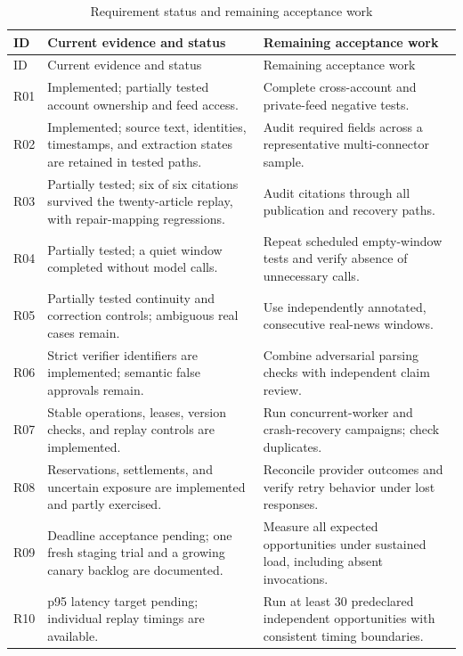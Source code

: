 \begingroup
\small
\renewcommand{\arraystretch}{1.05}
\begin{longtable}{L{0.9cm}L{6cm}L{\dimexpr\linewidth-6.9cm-6\tabcolsep\relax}}
\caption{Requirement status and remaining acceptance work}\label{tab:traceability}\\
\toprule ID & Current evidence and status & Remaining acceptance work \\ \midrule
\endfirsthead
\toprule ID & Current evidence and status & Remaining acceptance work \\ \midrule
\endhead
\bottomrule
\endfoot
R01 & Implemented; partially tested account ownership and feed access.
& Complete cross-account and private-feed negative tests. \\
R02 & Implemented; source text, identities, timestamps, and extraction states are retained in tested paths.
& Audit required fields across a representative multi-connector sample. \\
R03 & Partially tested; six of six citations survived the twenty-article replay, with repair-mapping regressions.
& Audit citations through all publication and recovery paths. \\
R04 & Partially tested; a quiet window completed without model calls.
& Repeat scheduled empty-window tests and verify absence of unnecessary calls. \\
R05 & Partially tested continuity and correction controls; ambiguous real cases remain.
& Use independently annotated, consecutive real-news windows. \\
R06 & Strict verifier identifiers are implemented; semantic false approvals remain.
& Combine adversarial parsing checks with independent claim review. \\
R07 & Stable operations, leases, version checks, and replay controls are implemented.
& Run concurrent-worker and crash-recovery campaigns; check duplicates. \\
R08 & Reservations, settlements, and uncertain exposure are implemented and partly exercised.
& Reconcile provider outcomes and verify retry behavior under lost responses. \\
R09 & Deadline acceptance pending; one fresh staging trial and a growing canary backlog are documented.
& Measure all expected opportunities under sustained load, including absent invocations. \\
R10 & p95 latency target pending; individual replay timings are available.
& Run at least 30 predeclared independent opportunities with consistent timing boundaries. \\

\end{longtable}
